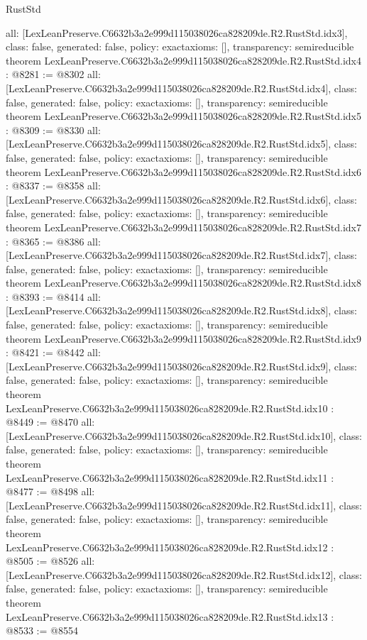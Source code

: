 \begin{lexlean}{RustStd}
\begin{coremodule}
{  all: [LexLeanPreserve.C6632b3a2e999d115038026ca828209de.R2.RustStd.idx3],
  class: false,
  generated: false,
  policy: exact{axioms: []},
  transparency: semireducible
}
theorem LexLeanPreserve.C6632b3a2e999d115038026ca828209de.R2.RustStd.idx4 : @8281 := @8302 {
  all: [LexLeanPreserve.C6632b3a2e999d115038026ca828209de.R2.RustStd.idx4],
  class: false,
  generated: false,
  policy: exact{axioms: []},
  transparency: semireducible
}
theorem LexLeanPreserve.C6632b3a2e999d115038026ca828209de.R2.RustStd.idx5 : @8309 := @8330 {
  all: [LexLeanPreserve.C6632b3a2e999d115038026ca828209de.R2.RustStd.idx5],
  class: false,
  generated: false,
  policy: exact{axioms: []},
  transparency: semireducible
}
theorem LexLeanPreserve.C6632b3a2e999d115038026ca828209de.R2.RustStd.idx6 : @8337 := @8358 {
  all: [LexLeanPreserve.C6632b3a2e999d115038026ca828209de.R2.RustStd.idx6],
  class: false,
  generated: false,
  policy: exact{axioms: []},
  transparency: semireducible
}
theorem LexLeanPreserve.C6632b3a2e999d115038026ca828209de.R2.RustStd.idx7 : @8365 := @8386 {
  all: [LexLeanPreserve.C6632b3a2e999d115038026ca828209de.R2.RustStd.idx7],
  class: false,
  generated: false,
  policy: exact{axioms: []},
  transparency: semireducible
}
theorem LexLeanPreserve.C6632b3a2e999d115038026ca828209de.R2.RustStd.idx8 : @8393 := @8414 {
  all: [LexLeanPreserve.C6632b3a2e999d115038026ca828209de.R2.RustStd.idx8],
  class: false,
  generated: false,
  policy: exact{axioms: []},
  transparency: semireducible
}
theorem LexLeanPreserve.C6632b3a2e999d115038026ca828209de.R2.RustStd.idx9 : @8421 := @8442 {
  all: [LexLeanPreserve.C6632b3a2e999d115038026ca828209de.R2.RustStd.idx9],
  class: false,
  generated: false,
  policy: exact{axioms: []},
  transparency: semireducible
}
theorem LexLeanPreserve.C6632b3a2e999d115038026ca828209de.R2.RustStd.idx10 : @8449 := @8470 {
  all: [LexLeanPreserve.C6632b3a2e999d115038026ca828209de.R2.RustStd.idx10],
  class: false,
  generated: false,
  policy: exact{axioms: []},
  transparency: semireducible
}
theorem LexLeanPreserve.C6632b3a2e999d115038026ca828209de.R2.RustStd.idx11 : @8477 := @8498 {
  all: [LexLeanPreserve.C6632b3a2e999d115038026ca828209de.R2.RustStd.idx11],
  class: false,
  generated: false,
  policy: exact{axioms: []},
  transparency: semireducible
}
theorem LexLeanPreserve.C6632b3a2e999d115038026ca828209de.R2.RustStd.idx12 : @8505 := @8526 {
  all: [LexLeanPreserve.C6632b3a2e999d115038026ca828209de.R2.RustStd.idx12],
  class: false,
  generated: false,
  policy: exact{axioms: []},
  transparency: semireducible
}
theorem LexLeanPreserve.C6632b3a2e999d115038026ca828209de.R2.RustStd.idx13 : @8533 := @8554 {
}
\end{coremodule}
\end{lexlean}
